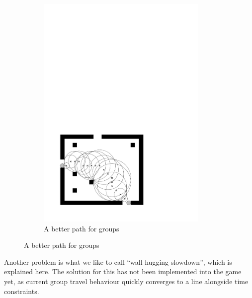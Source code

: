 \begin{figure}
\begin{subfigure}{0.40\textwidth}
\includegraphics[width=0.90\textwidth]{images/obst_path2.pdf}
\caption{A better path for groups}
\end{subfigure}
\end{figure}
Another problem is what we like to call ``wall hugging slowdown'', which is explained here. The solution for this has not been implemented into the game yet, as current group travel behaviour quickly converges to a line alongside time constraints.

